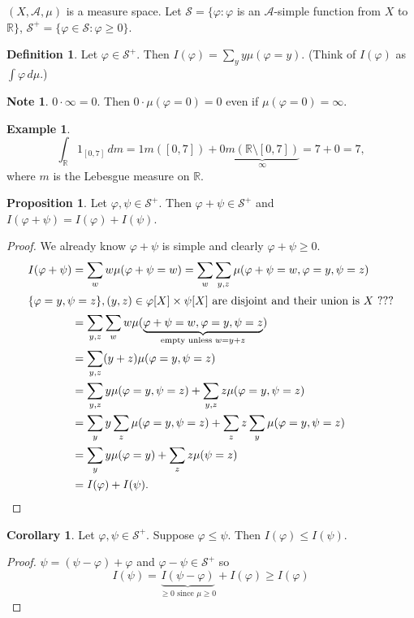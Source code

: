 \documentclass{article}
\newcommand{\R}{\mathbb{R}}
\newcommand{\oo}{{\infty}}
\theoremstyle{definition}
\newtheorem{corollary}[theorem]{Corollary}
\newtheorem{proposition}[theorem]{Proposition}
\newtheorem*{example}{Example}
\newtheorem*{definition}{Definition}
\newtheorem*{note}{Note}
\begin{document}
$(X, \mathscr{A}, \mu)$ is a measure space. Let $\mathscr{S} = \{ \varphi : \varphi$ is an $\mathscr{A}$-simple function from $X$ to $\R \}$, $\mathscr{S}^+ = \{\varphi \in \mathscr{S} : \varphi \geq 0\}$.

\begin{definition}
    Let $\varphi \in \mathscr{S}^+$. Then $I(\varphi) = \sum_y y\mu(\varphi = y)$. (Think of $I(\varphi)$ as $\int \varphi \,d\mu$.)
\end{definition}
\begin{note}
$0 \cdot \oo = 0$. Then $0 \cdot \mu(\varphi = 0) = 0$ even if $\mu(\varphi = 0) = \infty$.
\begin{example}


\[
    \int_\R 1_{[0,7]} \,dm = 1m([0,7]) + 0\underbrace{m(\R\setminus[0,7])}_\infty
         = 7 + 0 = 7,
\]
where $m$ is the Lebesgue measure on $\R$. 
\end{example}
\end{note}

\begin{proposition}
    Let $\varphi, \psi \in \mathscr{S}^+$. Then $\varphi + \psi \in \mathscr{S}^+$ and $I(\varphi + \psi) = I(\varphi) + I(\psi)$.
\end{proposition}
\begin{proof}
    We already know $\varphi + \psi$ is simple and clearly $\varphi + \psi \geq 0$.
    \begin{align*}
        I(\varphi + \psi) &= \sum_w w\mu(\varphi + \psi = w)
            = \sum_w \sum_{y,z} \mu(\varphi + \psi = w, \varphi = y, \psi = z) \\
        \intertext{$\{\varphi = y, \psi = z\}, (y,z) \in \varphi[X] \times \psi[X]$ are disjoint and their union is $X$ ???}
        &= \sum_{y,z} \sum_w w \mu(\underbrace{\varphi + \psi = w, \varphi = y, \psi = z}_{\text{empty unless } w = y+z}) \\ 
        &= \sum_{y,z} (y+z)\mu(\varphi = y, \psi = z) \\
        &= \sum_{y,z} y\mu(\varphi = y, \psi = z) + \sum_{y,z} z\mu(\varphi = y, \psi = z) \\
        &= \sum_y y \sum_z \mu(\varphi = y, \psi = z) + \sum_z z \sum_y \mu(\varphi = y, \psi = z) \\
        &= \sum_y y\mu(\varphi = y) + \sum_z z\mu(\psi = z) \\
        &= I(\varphi) + I(\psi).
    \end{align*}
\end{proof}
\begin{corollary}
    Let $\varphi, \psi \in \mathscr{S}^+$. Suppose $\varphi \leq \psi$. Then $I(\varphi) \leq I(\psi)$.
\end{corollary}
\begin{proof}
    $\psi = (\psi - \varphi) + \varphi$ and $\varphi - \psi \in \mathscr{S}^+$ so
    \[
        I(\psi) = \underbrace{I(\psi-\varphi)}_{\geq 0 \text{ since } \mu \geq 0} + I(\varphi) \geq I(\varphi)
    \]
\end{proof}
\end{document}
